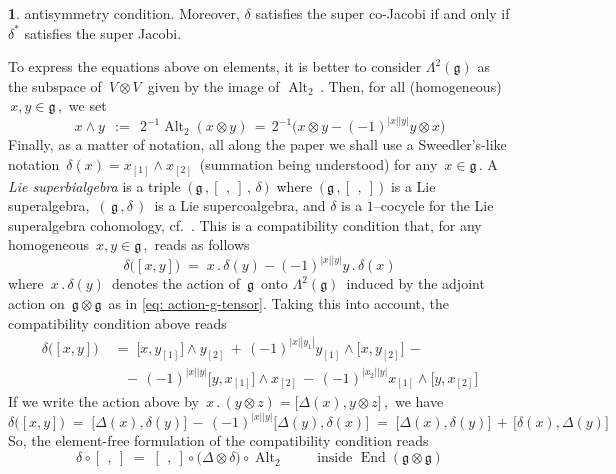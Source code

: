 \documentclass[12pt,reqno,twoside,a4paper]{amsart}
\numberwithin{equation}{section}
\theoremstyle{definition}
\newtheorem{free text}[lema]{}
\theoremstyle{remark}
\newcommand \End{\operatorname{End}}
\newcommand \Alt{\operatorname{Alt}}
\newcommand{\ot}{\otimes}
\def \lieg{\mathfrak{g}}
\theoremstyle{plain}
\begin{document}
\begin{free text}
 antisymmetry condition. Moreover,  $ \delta $  satisfies the super co-Jacobi if and only if  $ \delta^* $  satisfies the super Jacobi.
                                                \par
   To express the equations above on elements, it is better to consider  $ \Lambda^2(\lieg) $  as the subspace of  $ \, V \ot V \, $  given by the image of  $ \Alt_2 \, $.  Then, for all (homogeneous)  $ \, x , y \in \lieg \, $,  \,we set
%
  $$  x \wedge y  \,\; := \;\,  2^{-1} \Alt_2(x \ot y)  \, = \, 2^{-1} \big( x \otimes y - {(-1)}^{|x||y|} y \otimes x \big)  $$
%
   \indent   Finally, as a matter of notation, all along the paper we shall use a Sweedler's-like notation  $ \, \delta(x) = x_{[1]} \wedge x_{[2]} \, $  (summation being understood) for any  $ \, x \in \lieg \, $.
%
 \vskip3pt
%
   A  \emph{Lie superbialgebra\/}  is a triple  $ \, \big(\, \lieg \, , [\,\ ,\ ] \, , \, \delta \,\big) \, $  where
 $ \, \big(\, \lieg \, , [\,\ ,\ ] \,\big) \, $  is a Lie superalgebra,  $ \, (\,\lieg \, , \delta\,) \, $  is a Lie supercoalgebra, and  $ \delta $  is a  $ 1 $--cocycle  for the Lie superalgebra cohomology,  cf.\ \cite{Le}.  This is a compatibility condition that, for any homogeneous  $ \, x , y \in \lieg \, $,  \,reads as follows
%
\begin{equation*}
  \delta\big([x,y]\big)  \; = \;  x\,.\,\delta(y) - {(-1)}^{|x||y|} y\,.\,\delta(x)
\end{equation*}
%
 where  $ \, x\,.\,\delta(y) \, $  denotes the action of  $ \, \lieg \, $  onto  $ \Lambda^2(\lieg) \, $  induced by the adjoint action on  $ \, \lieg \ot \lieg \, $  as in  \eqref{eq: action-g-tensor}.  Taking this into account, the compatibility condition above reads
%
\begin{align*}
  \delta\big([x,y]\big)  &  \; = \;  \big[x,y_{[1]}\big] \wedge y_{[2]} \, + \, {(-1)}^{|x||y_1|} y_{[1]} \wedge \big[x,y_{[2]}\big]  \, -  \\
  &  \quad - \, {(-1)}^{|x||y|} \big[y,x_{[1]}\big] \wedge x_{[2]} \, - \, {(-1)}^{|x_{2}||y|} x_{[1]} \wedge \big[y,x_{[2]}\big]
\end{align*}
%
 If we write the action above by  $ \, x\,.\,(y \ot z) = \big[ \Delta(x) , y \ot z \big] \, $,  \,we have
%
  $$  \delta\big([x,y]\big)  \; = \;  \big[ \Delta(x) ,\delta(y) \big] \, - \, {(-1)}^{|x||y|} \big[ \Delta(y) , \delta(x) \big]  \; = \;  \big[ \Delta(x) , \delta(y) \big] \, + \, \big[ \delta(x) , \Delta(y) \big]  $$
%
 So, the element-free formulation of the compatibility condition reads
  $$  \delta \circ [\,\ ,\ ]  \; = \;  [\,\ ,\ ] \circ \big( \Delta \ot \delta \big) \circ \Alt_2   \qquad \text{ inside }  \End(\lieg\ot\lieg)  $$

\end{free text}
\end{document}
